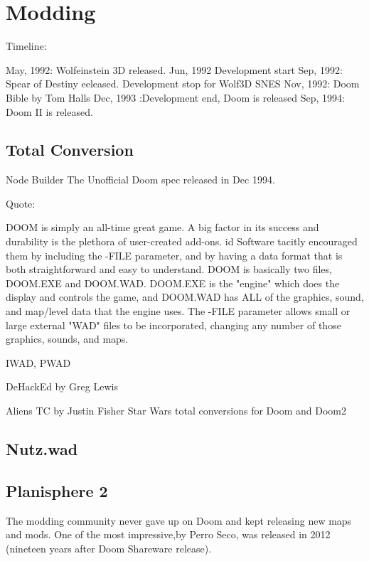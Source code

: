 \section{Modding}

\par
Timeline:

May, 1992: Wolfeinstein 3D released.
Jun, 1992 Development start
Sep, 1992: Spear of Destiny eeleased.
Development stop for Wolf3D SNES
Nov, 1992: Doom Bible by Tom Halls
Dec, 1993 :Development end, Doom is released
Sep, 1994: Doom II is released.


\subsection{Total Conversion}


Node Builder
The Unofficial Doom spec released in Dec 1994. 

Quote:

DOOM is simply an all-time great game. A big factor in its success
and durability is the plethora of user-created add-ons. id Software
tacitly encouraged them by including the -FILE parameter, and by having
a data format that is both straightforward and easy to understand.
DOOM is basically two files, DOOM.EXE and DOOM.WAD. DOOM.EXE is the
"engine" which does the display and controls the game, and DOOM.WAD has
ALL of the graphics, sound, and map/level data that the engine uses.
The -FILE parameter allows small or large external "WAD" files to be
incorporated, changing any number of those graphics, sounds, and maps.

IWAD, PWAD


DeHackEd by Greg Lewis


Aliens TC by Justin Fisher
Star Wars total conversions for Doom and Doom2

\subsection{Nutz.wad}

\subsection{Planisphere 2}
The modding community never gave up on Doom and kept releasing new maps and mods. One of the most impressive,by  Perro Seco, was released in 2012 (nineteen years after Doom Shareware release).\\
\par
{} 
\par
{} 
 
